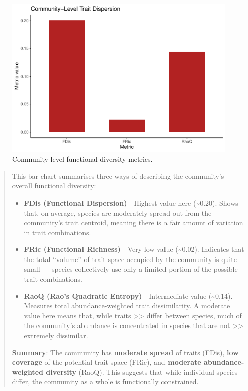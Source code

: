 \documentclass[
]{article}
\begin{document}
\begin{figure}
\includegraphics[width=1\linewidth]{man/figures/README-dispersion-metrics-1} \caption{Community-level functional diversity metrics.}\label{fig:dispersion-metrics}
\end{figure}

\begin{quote}
This bar chart summarises three ways of describing the community's
overall functional diversity:

\begin{itemize}
\item
  \textbf{FDis (Functional Dispersion)} - Highest value here
  (\textasciitilde0.20). Shows that, on average, species are moderately
  spread out from the community's trait centroid, meaning there is a
  fair amount of variation in trait combinations.
\item
  \textbf{FRic (Functional Richness)} - Very low value
  (\textasciitilde0.02). Indicates that the total ``volume'' of trait
  space occupied by the community is quite small --- species
  collectively use only a limited portion of the possible trait
  combinations.
\item
  \textbf{RaoQ (Rao's Quadratic Entropy)} - Intermediate value
  (\textasciitilde0.14). Measures total abundance-weighted trait
  dissimilarity. A moderate value here means that, while traits
  \textgreater\textgreater{} differ between species, much of the
  community's abundance is concentrated in species that are not
  \textgreater\textgreater{} extremely dissimilar.
\end{itemize}

\textbf{Summary}: The community has \textbf{moderate spread} of traits
(FDis), \textbf{low coverage} of the potential trait space (FRic), and
\textbf{moderate abundance-weighted diversity} (RaoQ). This suggests
that while individual species differ, the community as a whole is
functionally constrained.
\end{quote}
\end{document}
